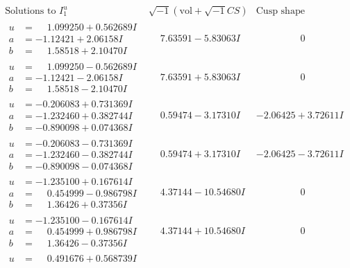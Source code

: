 \documentclass[1p]{elsarticle_modified}
\theoremstyle{definition}
\newcommand{\I}{\sqrt{-1}}
\begin{document}
$$\begin{array}{c|c|c}
\text{Solutions to }I^u_{1}& \I (\text{vol} + \sqrt{-1}CS) & \text{Cusp shape}\\
 \hline 
\begin{aligned}
u &= \phantom{-}1.099250 + 0.562689 I \\
a &= -1.12421 + 2.06158 I \\
b &= \phantom{-}1.58518 + 2.10470 I\end{aligned}
 & \phantom{-}7.63591 - 5.83063 I & \phantom{-0.000000 } 0 \\ \hline\begin{aligned}
u &= \phantom{-}1.099250 - 0.562689 I \\
a &= -1.12421 - 2.06158 I \\
b &= \phantom{-}1.58518 - 2.10470 I\end{aligned}
 & \phantom{-}7.63591 + 5.83063 I & \phantom{-0.000000 } 0 \\ \hline\begin{aligned}
u &= -0.206083 + 0.731369 I \\
a &= -1.232460 + 0.382744 I \\
b &= -0.890098 + 0.074368 I\end{aligned}
 & \phantom{-}0.59474 - 3.17310 I & -2.06425 + 3.72611 I \\ \hline\begin{aligned}
u &= -0.206083 - 0.731369 I \\
a &= -1.232460 - 0.382744 I \\
b &= -0.890098 - 0.074368 I\end{aligned}
 & \phantom{-}0.59474 + 3.17310 I & -2.06425 - 3.72611 I \\ \hline\begin{aligned}
u &= -1.235100 + 0.167614 I \\
a &= \phantom{-}0.454999 - 0.986798 I \\
b &= \phantom{-}1.36426 + 0.37356 I\end{aligned}
 & \phantom{-}4.37144 - 10.54680 I & \phantom{-0.000000 } 0 \\ \hline\begin{aligned}
u &= -1.235100 - 0.167614 I \\
a &= \phantom{-}0.454999 + 0.986798 I \\
b &= \phantom{-}1.36426 - 0.37356 I\end{aligned}
 & \phantom{-}4.37144 + 10.54680 I & \phantom{-0.000000 } 0 \\ \hline\begin{aligned}
u &= \phantom{-}0.491676 + 0.568739 I \\

\end{aligned}
\end{array}$$
\end{document}
